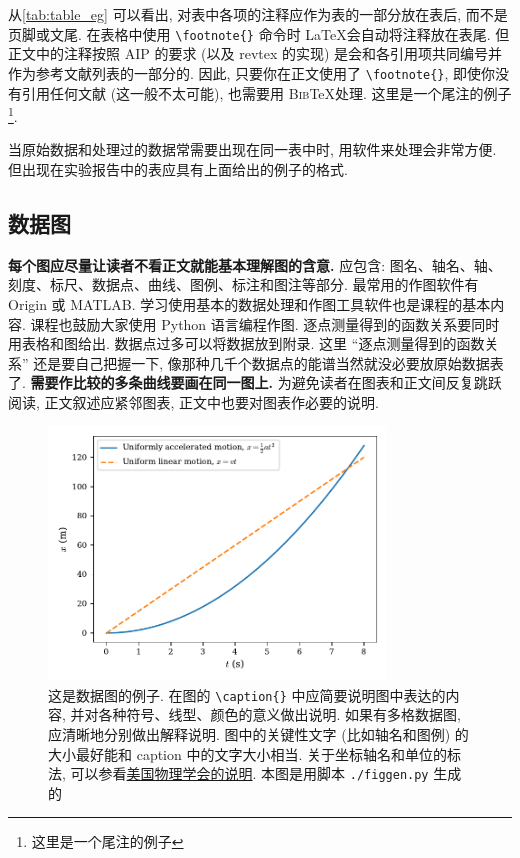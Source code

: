 \documentclass[font=notofandol]{mpltx}
\newcommand{\note}[1]{{\color{gray}#1}}
\begin{document}
从\autoref{tab:table_eg} 可以看出, 对表中各项的注释应作为表的一部分放在表后, 而不是页脚或文尾.
\note{在表格中使用 \texttt{\textbackslash{}footnote\{\}} 命令时 \LaTeX 会自动将注释放在表尾.
    但正文中的注释按照 AIP 的要求 (以及 \textsf{revtex} 的实现) 是会和各引用项共同编号并作为参考文献列表的一部分的.
    因此, 只要你在正文使用了 \texttt{\textbackslash{}footnote\{\}}, 即使你没有引用任何文献 (这一般不太可能), 也需要用 B\textsc{ib}\TeX 处理.
    这里是一个尾注的例子 \footnote{这里是一个尾注的例子}.}

当原始数据和处理过的数据常需要出现在同一表中时, 用软件来处理会非常方便.
但出现在实验报告中的表应具有上面给出的例子的格式.

\subsection{数据图}

\textbf{每个图应尽量让读者不看正文就能基本理解图的含意.}
应包含: 图名、轴名、轴、刻度、标尺、数据点、曲线、图例、标注和图注等部分.
最常用的作图软件有 Origin 或 MATLAB.
学习使用基本的数据处理和作图工具软件也是课程的基本内容.
课程也鼓励大家使用 Python 语言编程作图.
逐点测量得到的函数关系要同时用表格和图给出.
\note{数据点过多可以将数据放到附录.
    这里 ``逐点测量得到的函数关系'' 还是要自己把握一下, 像那种几千个数据点的能谱当然就没必要放原始数据表了.}
\textbf{需要作比较的多条曲线要画在同一图上.}
为避免读者在图表和正文间反复跳跃阅读, 正文叙述应紧邻图表, 正文中也要对图表作必要的说明.

\begin{figure}
    \centering
    \includegraphics[width=0.8\textwidth]{fig/figsample.pdf}
    \caption{这是数据图的例子.
        \note{在图的 \texttt{\textbackslash{}caption\{\}} 中应简要说明图中表达的内容, 并对各种符号、线型、颜色的意义做出说明.
            如果有多格数据图, 应清晰地分别做出解释说明.
            图中的关键性文字 (比如轴名和图例) 的大小最好能和 caption 中的文字大小相当.
            关于坐标轴名和单位的标法, 可以参看\href{https://journals.aps.org/authors/axis-labels-and-scales-on-graphs-h18}{美国物理学会的说明}.
            本图是用脚本 \texttt{./figgen.py} 生成的}}
    \label{fig:data}
\end{figure}
\end{document}
